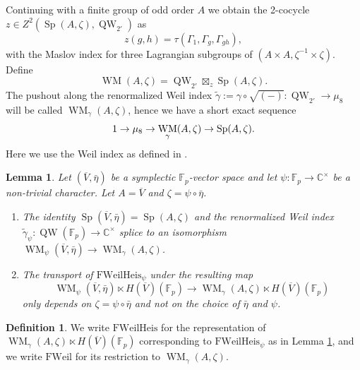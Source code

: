 \documentclass{article}
\def\C{\mathbb{C}}
\def\F{\mathbb{F}}
\def\ol#1{\overline{#1}}
\newcommand{\bF}{\mathbb{F}}
\DeclareMathOperator{\Sp}{Sp}
\newtheorem{lem}[thm]{Lemma}
\theoremstyle{definition}
\newtheorem{dfn}[thm]{Definition}
\numberwithin{equation}{subsection}
\renewcommand{\-}{\hyp{}}
\DeclareMathOperator{\WM}{WM}
\DeclareMathOperator{\QW}{QW}
\begin{document}
\begin{appendices}
Continuing with a finite group of odd order $A$ we obtain the 2-cocycle $z \in Z^2(\Sp(A,\zeta),\QW_{2'})$ as 
\[ z(g,h) = \tau(\Gamma_1,\Gamma_g,\Gamma_{gh}), \]
with the Maslov index for three Lagrangian subgroups of $(A \times A,\zeta^{-1} \times \zeta)$. Define\index[notation]{WM@$\WM$} 
\[ \WM(A,\zeta) = \QW_{2'} \boxtimes_z \Sp(A,\zeta). \]
The pushout along the renormalized Weil index $\tilde\gamma:=\gamma \circ \sqrt{(-)} : \QW_{2'} \to \mu_8$ will be called $\WM_\gamma(A,\zeta)$, hence we have a short exact sequence
\[ 1 \ra \mu_8 \ra \WM_\gamma(A,\zeta) \ra \Sp(A,\zeta) .\]
Here we use the Weil index as defined in \cite[4.2~Lemma]{Weissauer1986}. 

\begin{lem}\label{lem:FWeilHeisgamma}
Let $(\ol{V},\bar\eta)$ be a symplectic $\F_p$-vector space and let $\psi : \F_p \to \C^\times$ be a non-trivial character. Let $A=\ol{V}$ and $\zeta=\psi\circ\bar\eta$. 
\begin{enumerate}
	\item The identity $\Sp(\ol{V},\bar\eta)=\Sp(A,\zeta)$ and the renormalized Weil index $\tilde\gamma_\psi : \QW(\F_p) \to \C^\times$ splice to an isomorphism  $\WM_\psi(\ol{V},\bar\eta)\to \WM_\gamma(A,\zeta)$.
	\item The transport of $\mathrm{FWeilHeis}_\psi$ under the resulting map 
	\[ \WM_\psi(\ol{V},\bar\eta) \ltimes H(\ol{V})(\bF_p) \to \WM_\gamma(A,\zeta) \ltimes H(\ol{V})(\bF_p)\]	
	only depends on $\zeta=\psi \circ \bar \eta$ and not on the choice of $\bar \eta$ and $\psi$. \end{enumerate}
\end{lem}
\begin{dfn}\label{dfn:FWeilHeis}
	We write $\mathrm{FWeilHeis}$ for the representation of  $\WM_\gamma(A,\zeta)\ltimes H(\ol{V})(\bF_p) $ corresponding to $\mathrm{FWeilHeis}_\psi$ as in Lemma \ref{lem:FWeilHeisgamma}, and we write $\mathrm{FWeil}$ for its restriction to $\WM_\gamma(A,\zeta)$.
\end{dfn}

\end{appendices}

\printindex[notation]
\printindex[terminology]




\end{document}
